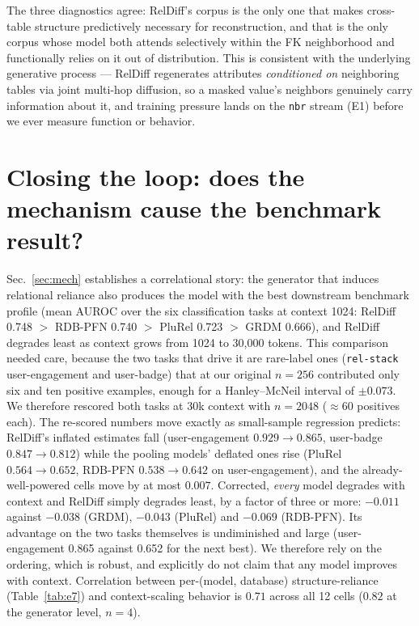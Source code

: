 \documentclass{article}
\begin{document}
The three diagnostics agree: RelDiff's corpus is the only one that makes cross-table structure predictively necessary for reconstruction, and that is the only corpus whose model both attends selectively within the FK neighborhood and functionally relies on it out of distribution. This is consistent with the underlying generative process --- RelDiff regenerates attributes \emph{conditioned on} neighboring tables via joint multi-hop diffusion, so a masked value's neighbors genuinely carry information about it, and training pressure lands on the \texttt{nbr} stream (E1) before we ever measure function or behavior.

\section{Closing the loop: does the mechanism cause the benchmark result?}
\label{sec:bridge}

Sec.~\ref{sec:mech} establishes a correlational story: the generator that induces relational reliance also produces the model with the best downstream benchmark profile (mean AUROC over the six classification tasks at context 1024: RelDiff 0.748 $>$ RDB-PFN 0.740 $>$ PluRel 0.723 $>$ GRDM 0.666), and RelDiff degrades least as context grows from 1024 to 30{,}000 tokens. This comparison needed care, because the two tasks that drive it are rare-label ones (\texttt{rel-stack} user-engagement and user-badge) that at our original $n{=}256$ contributed only six and ten positive examples, enough for a Hanley--McNeil interval \cite{hanley} of $\pm 0.073$. We therefore rescored both tasks at 30k context with $n{=}2048$ ($\approx$60 positives each). The re-scored numbers move exactly as small-sample regression predicts: RelDiff's inflated estimates fall (user-engagement $0.929 \rightarrow 0.865$, user-badge $0.847 \rightarrow 0.812$) while the pooling models' deflated ones rise (PluRel $0.564 \rightarrow 0.652$, RDB-PFN $0.538 \rightarrow 0.642$ on user-engagement), and the already-well-powered cells move by at most $0.007$. Corrected, \emph{every} model degrades with context and RelDiff simply degrades least, by a factor of three or more: $-0.011$ against $-0.038$ (GRDM), $-0.043$ (PluRel) and $-0.069$ (RDB-PFN). Its advantage on the two tasks themselves is undiminished and large (user-engagement 0.865 against 0.652 for the next best). We therefore rely on the ordering, which is robust, and explicitly do not claim that any model improves with context. Correlation between per-(model, database) structure-reliance (Table~\ref{tab:e7}) and context-scaling behavior is $0.71$ across all 12 cells ($0.82$ at the generator level, $n{=}4$).
\end{document}

